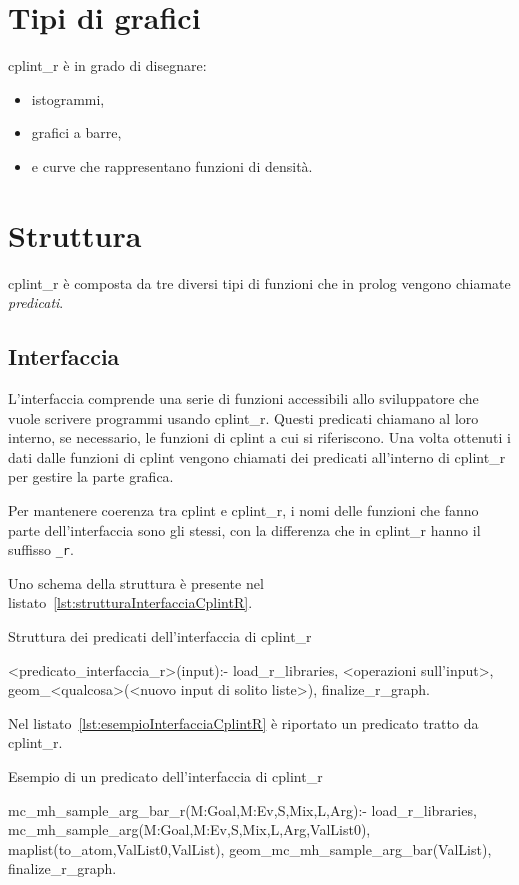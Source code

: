 \documentclass[10pt,titlepage,twoside,a4paper]{report}
\newenvironment{code}{\singlespacing\captionsetup{type=listing}}{}
\begin{document}
\section{Tipi di grafici}
cplint\_r è in grado di disegnare:
\begin{itemize}
    \item istogrammi,
    \item grafici a barre,
    \item e curve che rappresentano funzioni di densità.
\end{itemize}

\section{Struttura}
cplint\_r è composta da tre diversi tipi di funzioni che in prolog vengono 
chiamate \emph{predicati}.

\subsection{Interfaccia}
L'interfaccia comprende una serie di funzioni accessibili allo sviluppatore che 
vuole scrivere programmi usando cplint\_r. Questi predicati chiamano al loro 
interno, se necessario, le funzioni di cplint a cui si riferiscono. Una volta 
ottenuti i dati dalle funzioni di cplint vengono chiamati dei predicati 
all'interno di cplint\_r per gestire la parte grafica.

Per mantenere coerenza tra cplint e cplint\_r, i nomi delle funzioni che fanno 
parte dell'interfaccia sono gli stessi, con la differenza che in cplint\_r
hanno il suffisso \texttt{\_r}.

Uno schema della struttura è presente nel 
listato~\ref{lst:strutturaInterfacciaCplintR}.

\begin{code}
    \caption{Struttura dei predicati dell'interfaccia di cplint\_r}
    \label{lst:strutturaInterfacciaCplintR}
    \begin{prologcode*}{}
<predicato_interfaccia_r>(input):-
    load_r_libraries,
    <operazioni sull'input>,
    geom_<qualcosa>(<nuovo input di solito liste>),
    finalize_r_graph.
    \end{prologcode*}
\end{code}

Nel listato~\ref{lst:esempioInterfacciaCplintR} è riportato un predicato
tratto da cplint\_r.

\begin{code}
    \caption{Esempio di un predicato dell'interfaccia di cplint\_r}
    \label{lst:esempioInterfacciaCplintR}
    \begin{prologcode*}{}
mc_mh_sample_arg_bar_r(M:Goal,M:Ev,S,Mix,L,Arg):-
    load_r_libraries,
    mc_mh_sample_arg(M:Goal,M:Ev,S,Mix,L,Arg,ValList0),
    maplist(to_atom,ValList0,ValList),
    geom_mc_mh_sample_arg_bar(ValList),
    finalize_r_graph.
    \end{prologcode*}
\end{code}
\end{document}
